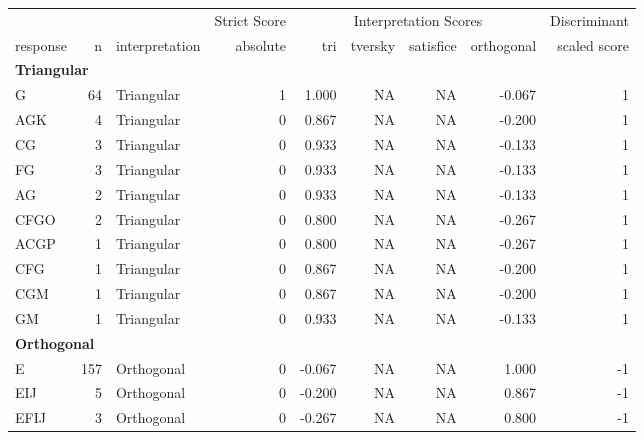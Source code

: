 \documentclass[
  letterpaper,
  DIV=11,
  numbers=noendperiod]{scrreprt}
\begin{document}
\begin{tabular}[t]{l|r|l|r|r|r|r|r|r}
\hline
\multicolumn{3}{c|}{ } & \multicolumn{1}{c|}{Strict Score} & \multicolumn{4}{c|}{Interpretation Scores} & \multicolumn{1}{c}{Discriminant} \\
\cline{4-4} \cline{5-8} \cline{9-9}
response & n & interpretation & absolute & tri & tversky & satisfice & orthogonal & scaled score\\
\hline
\multicolumn{9}{l}{\textbf{Triangular}}\\
\hline
\hspace{1em}G & 64 & Triangular & 1 & 1.000 & NA & NA & -0.067 & 1\\
\hline
\hspace{1em}AGK & 4 & Triangular & 0 & 0.867 & NA & NA & -0.200 & 1\\
\hline
\hspace{1em}CG & 3 & Triangular & 0 & 0.933 & NA & NA & -0.133 & 1\\
\hline
\hspace{1em}FG & 3 & Triangular & 0 & 0.933 & NA & NA & -0.133 & 1\\
\hline
\hspace{1em}AG & 2 & Triangular & 0 & 0.933 & NA & NA & -0.133 & 1\\
\hline
\hspace{1em}CFGO & 2 & Triangular & 0 & 0.800 & NA & NA & -0.267 & 1\\
\hline
\hspace{1em}ACGP & 1 & Triangular & 0 & 0.800 & NA & NA & -0.267 & 1\\
\hline
\hspace{1em}CFG & 1 & Triangular & 0 & 0.867 & NA & NA & -0.200 & 1\\
\hline
\hspace{1em}CGM & 1 & Triangular & 0 & 0.867 & NA & NA & -0.200 & 1\\
\hline
\hspace{1em}GM & 1 & Triangular & 0 & 0.933 & NA & NA & -0.133 & 1\\
\hline
\multicolumn{9}{l}{\textbf{Orthogonal}}\\
\hline
\hspace{1em}E & 157 & Orthogonal & 0 & -0.067 & NA & NA & 1.000 & -1\\
\hline
\hspace{1em}EIJ & 5 & Orthogonal & 0 & -0.200 & NA & NA & 0.867 & -1\\
\hline
\hspace{1em}EFIJ & 3 & Orthogonal & 0 & -0.267 & NA & NA & 0.800 & -1\\

\end{tabular}
\end{document}
